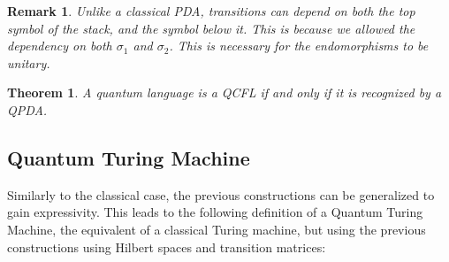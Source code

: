 \documentclass[12pt,a4paper]{article}
\theoremstyle{plain}
\newtheorem*{theorem}{Theorem}
\newtheorem*{remark}{Remark}
\theoremstyle{definition}
\begin{document}
\begin{remark}
    Unlike a classical PDA, transitions can depend on both the top symbol of the stack, and the symbol below it. This is because we allowed the dependency on both $\sigma_1$ and $\sigma_2$. This is necessary for the endomorphisms to be unitary. 
\end{remark}

\begin{theorem}
    A quantum language is a QCFL if and only if it is recognized by a QPDA.
\end{theorem}

\subsection{Quantum Turing Machine}
Similarly to the classical case, the previous constructions can be generalized to gain expressivity. This leads to the following definition of a Quantum Turing Machine\cite{qtm-circuits}\cite{qc-theory-bernstein}, the equivalent of a classical Turing machine, but using the previous constructions using Hilbert spaces and transition matrices:
\end{document}
